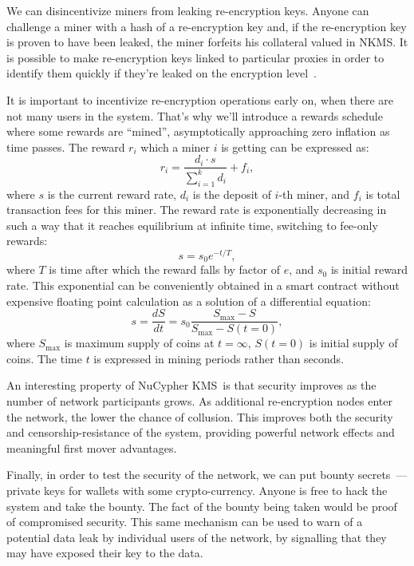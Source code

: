\documentclass[longbibliography,nofootinbib]{revtex4-1}
\newcommand{\kms}{NuCypher KMS}
\begin{document}
\begin{CJK*}{UTF8}{gbsn}
We can disincentivize miners from leaking re-encryption keys.
Anyone can challenge a miner with a hash of a re-encryption key and, if the re-encryption key is proven to have been leaked, the miner forfeits his collateral
valued in NKMS.
It is possible to make re-encryption keys linked to particular proxies in order to identify them quickly if they're leaked on the encryption
level~\cite{Libert2008}.

It is important to incentivize re-encryption operations early on, when there are not many users in the system.
That's why we'll introduce a rewards schedule where some rewards are ``mined'', asymptotically approaching zero inflation as time passes.
The reward $r_i$ which a miner $i$ is getting can be expressed as:
\begin{equation}
    r_i = \frac{d_i \cdot s}{\sum_{i=1}^k d_i} + f_i,
\end{equation}
where $s$ is the current reward rate, $d_i$ is the deposit of $i$-th miner, and $f_i$ is total transaction fees for this miner.
The reward rate is exponentially decreasing in such a way that it reaches equilibrium at infinite time, switching to fee-only rewards:
\begin{equation}
    s = s_0 e^{-t/T},
\end{equation}
where $T$ is time after which the reward falls by factor of $e$, and $s_0$ is initial reward rate.
This exponential can be conveniently obtained in a smart contract without expensive floating point calculation as a solution of a differential equation:
\begin{equation}
    s = \frac{dS}{dt}= s_0 \frac{S_{\max} - S}{S_{\max} - S(t=0)},
\end{equation}
where $S_{\max}$ is maximum supply of coins at $t=\infty$, $S(t=0)$ is initial supply of coins.
The time $t$ is expressed in mining periods rather than seconds.

An interesting property of \kms~is that security improves as the number of network participants grows. As additional re-encryption
nodes enter the network, the lower the chance of collusion.
This improves both the security and censorship-resistance of the system, providing powerful network effects and meaningful first mover advantages.

Finally, in order to test the security of the network, we can put bounty secrets~--- private keys for wallets with
some crypto-currency.
Anyone is free to hack the system and take the bounty.
The fact of the bounty being taken would be proof of compromised security.
This same mechanism can be used to warn of a potential data leak by individual users of the network, by signalling that they may have exposed
their key to the data.


\end{CJK*}
\end{document}
